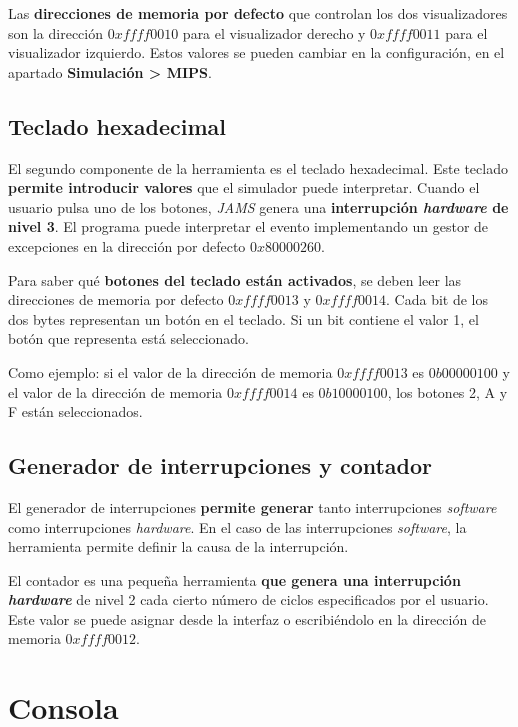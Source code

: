 \noindent Las \textbf{direcciones de memoria por defecto} que controlan los dos
visualizadores son la dirección $0xffff0010$ para el visualizador derecho y
$0xffff0011$ para el visualizador izquierdo.
Estos valores se pueden cambiar en la configuración,
en el apartado \textbf{Simulación > MIPS}.

\subsection{Teclado hexadecimal}\label{subsec:teclado-hexadecimal}

El segundo componente de la herramienta es el teclado hexadecimal.
Este teclado \textbf{permite introducir valores} que el
simulador puede interpretar.
Cuando el usuario pulsa uno de los botones,
\textit{JAMS} genera una \textbf{interrupción \textit{hardware} de nivel 3}.
El programa puede interpretar el evento implementando un gestor
de excepciones en la dirección por defecto $0x80000260$.

\noindent Para saber qué \textbf{botones del teclado están activados},
se deben leer las direcciones de memoria por defecto $0xffff0013$ y $0xffff0014$.
Cada bit de los dos bytes representan un botón en el teclado.
Si un bit contiene el valor 1, el botón que representa está seleccionado.

\noindent Como ejemplo: si el valor de la dirección de memoria
$0xffff0013$ es $0b00000100$ y el valor de la dirección de memoria
$0xffff0014$ es $0b10000100$, los botones 2, A y F están seleccionados.

\subsection{Generador de interrupciones y contador}\label{subsec:generador-de-interrupciones-contador}

El generador de interrupciones \textbf{permite generar} tanto
interrupciones \textit{software} como interrupciones \textit{hardware}.
En el caso de las interrupciones \textit{software},
la herramienta permite definir la causa de la interrupción.

\noindent El contador es una pequeña herramienta
\textbf{que genera una interrupción \textit{hardware}}
de nivel 2 cada cierto número de ciclos especificados por el usuario.
Este valor se puede asignar desde la interfaz o escribiéndolo
en la dirección de memoria $0xffff0012$.

\section{Consola}\label{sec:consola}

